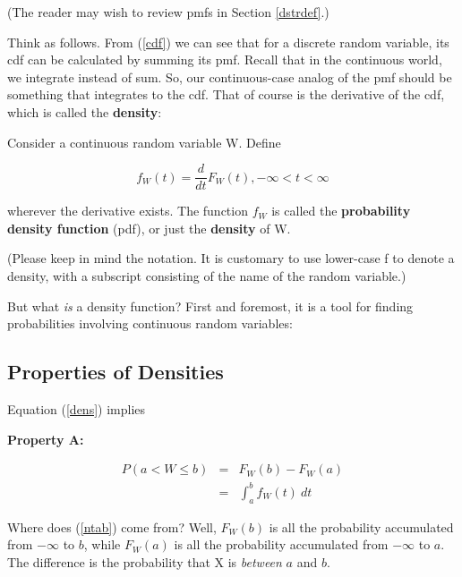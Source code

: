 {}

(The reader may wish to review pmfs in Section \ref{dstrdef}.)

Think as follows.  From (\ref{cdf}) we can see that for a discrete
random variable, its cdf can be calculated by summing its pmf.  Recall
that in the continuous world, we integrate instead of sum.
So, our continuous-case analog of the pmf should be
something that integrates to the cdf.  That of course is the derivative
of the cdf, which is called the {\bf density}:  

\begin{definition} 
Consider a continuous random variable W.  Define

\begin{equation}
\label{dens}
f_W(t) = \frac{d}{dt} F_W(t), -\infty < t < \infty
\end{equation}

wherever the derivative exists.  The function $f_W$ is called the {\bf
probability density function} (pdf), or just the {\bf density} of W.
\end{definition}

(Please keep in mind the notation.  It is customary to use lower-case f
to denote a density, with a subscript consisting of the name of the
random variable.)

But what {\it is} a density function?  First and foremost, it is a tool
for finding probabilities involving continuous random variables:

\subsection{Properties of Densities}

Equation (\ref{dens}) implies 

{\bf Property A:}

\begin{eqnarray}
\label{ntab}
P(a < W \leq b) &=& F_W(b) - F_W(a) \\
&=& \int_{a}^{b} f_W(t) ~ dt \label{ftc}
\end{eqnarray}

Where does (\ref{ntab}) come from?  Well, $F_W(b)$ is all the
probability accumulated from $-\infty$ to $b$, while $F_W(a)$ is all the
probability accumulated from $-\infty$ to $a$.  The difference is the
probability that X is {\it between} $a$ and $b$.

